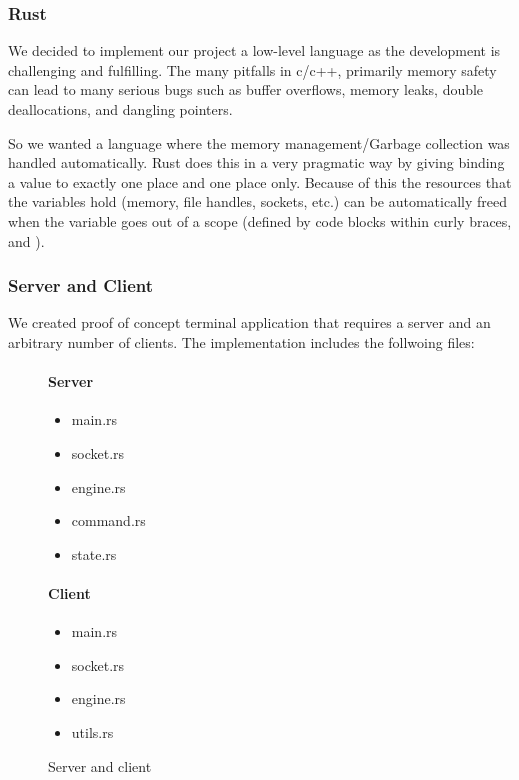 



\subsubsection{Rust}
We decided to implement our project a low-level language as the
development is challenging and fulfilling. The many pitfalls in c/c++,
primarily memory safety can lead to many serious bugs such as buffer
overflows, memory leaks, double deallocations, and dangling
pointers.

So we wanted a language where the memory management/Garbage
collection was handled automatically. Rust does this in a very
pragmatic way by giving binding a value to exactly one place and
one place only. Because of this the resources that the variables
hold (memory, file handles, sockets, etc.) can be automatically freed
when the variable goes out of a scope (defined by code blocks within
curly braces, { and }).

\subsubsection{Server and Client}
We created proof of concept terminal application that requires a
server and an arbitrary number of clients. The implementation includes
the follwoing files:
\begin{figure}[h]
  \begin{minipage}{0.5\textwidth}
    \paragraph{Server}
    \begin{itemize}
      \item main.rs
      \item socket.rs
      \item engine.rs
      \item command.rs
      \item state.rs
    \end{itemize}
  \end{minipage} \hfill
  \begin{minipage}{0.5\textwidth}
    \paragraph{Client}
    \begin{itemize}
      \item main.rs
      \item socket.rs
      \item engine.rs
      \item utils.rs
    \end{itemize}
  \end{minipage} \vfill
  \caption{Server and client}
\end{figure}

